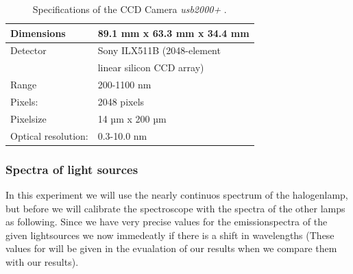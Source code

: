 \begin{table}[h]
\centering
\begin{tabular}{| l | l |}
    \hline
    Dimensions & 89.1 mm x 63.3 mm x 34.4 mm \\ 
    \hline
    Detector & Sony ILX511B (2048-element \\
             & linear silicon CCD array) \\  
    \hline
    Range & 200-1100 nm \\ 
    \hline
    Pixels: & 2048 pixels \\ 
    \hline
    Pixelsize & 14 µm x 200 µm \\ 
    \hline
    Optical resolution: & 0.3-10.0 nm \\ 
    \hline
\end{tabular}
    \caption{Specifications of the  CCD Camera \textit{usb2000+}
        \cite{usb2000_site}.}
\label{tab:ccd}
\end{table}

\subsubsection{Spectra of light sources}
In this experiment we will use the nearly continuos spectrum of
the halogenlamp, but before we will calibrate the spectroscope
with the spectra of the other lamps as following.
Since we have very precise values for the emissionspectra of 
the given lightsources \cite{nist} we now immedeatly if
there is a shift in wavelengths (These values for will be given
in the evualation of our results when we compare them with our
results).


